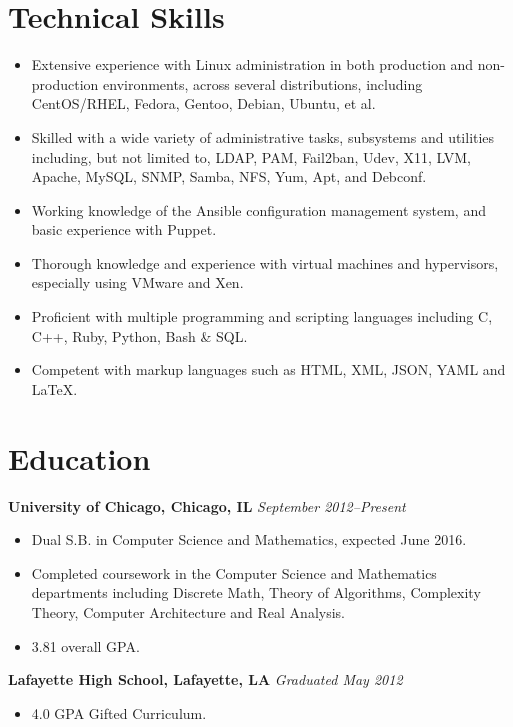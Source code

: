 \documentclass[10pt,letterpaper]{article} %
\begin{document}
    \section*{Technical Skills} 
        \begin{itemize}
        \item Extensive experience with Linux administration in both production and non-production environments, across several distributions, including CentOS/RHEL, Fedora, Gentoo, Debian, Ubuntu, et al.  
	\item Skilled with a wide variety of administrative tasks, subsystems and utilities including, but not limited to, LDAP, PAM, Fail2ban, Udev, X11, LVM, Apache, MySQL, SNMP, Samba, NFS, Yum,  Apt, and Debconf. 
        \item Working knowledge of the Ansible configuration management system, and basic experience with Puppet.
        \item Thorough knowledge and experience with virtual machines and hypervisors, especially using VMware and Xen. 
        \item Proficient with multiple programming and scripting languages including C, C++, Ruby, Python, Bash \& SQL.
        \item Competent with markup languages such as HTML, XML, JSON, YAML and \LaTeX.
        \end{itemize}          
    \section*{Education}
        \textbf{University of Chicago, Chicago, IL } \hfill \textit{ September 2012--Present } 
        \begin{itemize} 
            \item Dual S.B. in Computer Science and Mathematics, expected June 2016. 
            \item Completed coursework in the Computer Science and Mathematics departments including Discrete Math, Theory of Algorithms, Complexity Theory, Computer Architecture and Real Analysis.  
            \item 3.81 overall GPA.
        \end{itemize}
        \textbf{Lafayette High School, Lafayette, LA } \hfill \textit{Graduated May 2012 } 
        \begin{itemize}
           \item 4.0 GPA Gifted Curriculum.
      \end{itemize}
\end{document}
